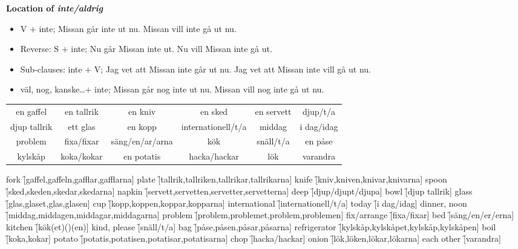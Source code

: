 
\begin{flushleft}
    \textbf{Location of \textsl{inte/aldrig}}
    \begin{itemize}
        \item V $+$ inte; Missan går inte ut nu. Missan vill inte gå ut nu.
        \item Reverse: S $+$ inte; Nu går Missan inte ut. Nu vill Missan inte gå ut.
        \item Sub-clauses: inte $+$ V; Jag vet att Missan inte går ut nu. Jag vet att Missan inte vill gå ut nu.
        \item väl, nog, kanske\ldots $+$ inte; Missan går nog inte ut nu. Missan vill nog inte gå ut nu.
    \end{itemize}
\end{flushleft}

\begin{center}
    \begin{tabular}{|c c c c c c|}
        \hline
        en gaffel & en tallrik & en kniv & en sked & en servett & djup/t/a \\
        djup tallrik & ett glas & en kopp & internationell/t/a & middag & i dag/idag \\
        problem & fixa/fixar & säng/en/ar/arna & kök & snäll/t/a & en påse \\
        kylskåp & koka/kokar & en potatis & hacka/hackar & lök & varandra \\
        \hline
    \end{tabular}
\end{center}

\begin{questions}
    \begin{multicols}{2}
        \raggedcolumns
        \question fork \f[gaffel,gaffeln,gafflar,gafflarna]
        \question plate \f[tallrik,tallriken,tallrikar,tallrikarna]
        \question knife \f[kniv,kniven,knivar,knivarna]
        \question spoon \f[sked,skeden,skedar,skedarna]
        \question napkin \f[servett,servetten,servetter,servetterna]
        \question deep \f[djup/djupt/djupa]
        \question bowl \f[djup tallrik]
        \question glass \f[glas,glaset,glas,glasen]
        \question cup \f[kopp,koppen,koppar,kopparna]
        \question international \f[internationell/t/a]
        \question today \f[i dag/idag]
        \question dinner, noon \f[middag,middagen,middagar,middagarna]
        \question problem \f[problem,problemet,problem,problemen]
        \question fix/arrange \f[fixa/fixar]
        \question bed \f[säng/en/er/erna]
        \question kitchen \f[kök(et)()(en)]
        \question kind, please \f[snäll/t/a]
        \question bag \f[påse,påsen,påsar,påsarna]
        \question refrigerator \f[kylskåp,kylskåpet,kylskåp,kylskåpen]
        \question boil \f[koka,kokar]
        \question potato \f[potatis,potatisen,potatisar,potatisarna]
        \question chop \f[hacka/hackar]
        \question onion \f[lök,löken,lökar,lökarna]
        \question each other \f[varandra]
    \end{multicols}
\end{questions}
